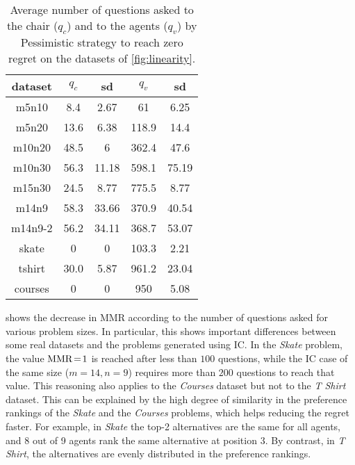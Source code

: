 \documentclass[runningheads]{llncs}
\begin{document}
\begin{table}[ht]
	\caption{Average number of questions asked to the chair ($q_{c}$) and to the agents (\textit{$q_{v}$}) by Pessimistic strategy to reach zero regret on the datasets of \cref{fig:linearity}.}
	\label{tab:Numquestions}
	\begin{tabular}{cS[table-number-alignment = right, table-figures-integer=4]@{ ± }S[table-number-alignment = left, table-figures-integer=2]S[table-number-alignment = right, table-figures-integer=4]@{ ± }S[table-number-alignment = left, table-figures-integer=2]}
		\toprule
		{dataset} & {$q_{c}$} & {sd} & {$q_{v}$} & {sd} \\
		\midrule
		m5n10 	&	8.4		& 2.67 		& 61		& 6.25\\
		m5n20 	&	13.6	& 6.38		& 118.9		& 14.4\\
		m10n20 	&	48.5	& 6			& 362.4		& 47.6	\\
		m10n30 	&	56.3	& 11.18		& 598.1 	& 75.19	\\
		m15n30 	&	24.5	& 8.77		& 775.5		& 8.77	\\
		m14n9 	&	58.3	& 33.66		& 370.9		& 40.54	\\
		m14n9-2 &	56.2	& 34.11		& 368.7		& 53.07 \\
		skate 	&	0		& 0			& 103.3		& 2.21	\\
		tshirt  &	30.0	& 5.87		& 961.2		& 23.04	\\
		courses & 0			& 0			& 950		& 5.08	\\	
		\bottomrule
	\end{tabular}
\end{table}

 shows the decrease in MMR according to the number of questions asked for various problem sizes. In particular, this shows important differences between some real datasets and the problems generated using IC.
In the \textit{Skate} problem, the value $\operatorname{MMR}\!=\!1$ is reached after less than $100$ questions, while the IC case of the same size ($m = 14, n = 9$) requires more than $200$ questions to reach that value. This reasoning also applies to the \textit{Courses} dataset but not to the \textit{T Shirt} dataset. This can be explained by the high degree of similarity in the preference rankings of the \textit{Skate} and the \textit{Courses} problems, which helps reducing the regret faster. For example, in \textit{Skate} the top-2 alternatives are the same for all agents, and 8 out of 9 agents rank the same alternative at position 3. By contrast, in \textit{T Shirt}, the alternatives are evenly distributed in the preference rankings. 
\end{document}
